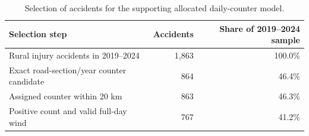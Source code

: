 \begin{table}[H]
\centering
\small
\caption[Selection for the supporting counter model.]{Selection of accidents for the supporting allocated daily-counter model.}
\label{tab:allocated-selection}

\begin{tabularx}{0.86\textwidth}{Xrr}
\toprule
Selection step & Accidents & Share of 2019--2024 sample \\
\midrule
Rural injury accidents in 2019--2024 & 1,863 & 100.0\% \\ \grayhline
Exact road-section/year counter candidate & 864 & 46.4\% \\ \grayhline
Assigned counter within 20 km & 863 & 46.3\% \\ \grayhline
Positive count and valid full-day wind & 767 & 41.2\% \\
\bottomrule
\end{tabularx}
\end{table}
